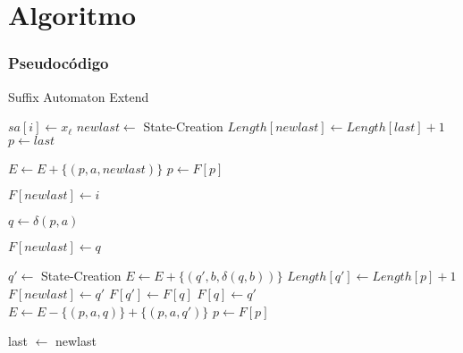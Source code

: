 \section{Algoritmo}\label{Algorithm}

\subsubsection{Pseudocódigo}


\begin{alg}
	Suffix Automaton Extend
	\begin{algorithmic}[1]
		
			\State $sa[i] \leftarrow x_\ell$
			\State $newlast \leftarrow$ State-Creation
			\State $Length[newlast] \leftarrow Length[last]+1$
			\State $p \leftarrow last$
		
				\State  $E \leftarrow E + \{(p, a, newlast)\}$
				\State  $p \leftarrow F[p]$
			\EndWhile
			
				\State $F[newlast] \leftarrow i$
			
			\Else
				\State $q \leftarrow \delta(p, a)$
				
					\State $F[newlast] \leftarrow q$
				
				\Else
					\State $q' \leftarrow$ State-Creation
						\State  $E \leftarrow E + \{(q', b, \delta(q, b))\}$
					\EndFor
					\State $Length[q'] \leftarrow Length[p]+1$
					\State $F[newlast] \leftarrow q'$
					\State $F[q'] \leftarrow F[q]$
					\State $F[q] \leftarrow q'$
						\State  $E \leftarrow E - \{(p, a, q)\} + \{(p, a, q')\}$
						\State  $p \leftarrow F[p]$
					\EndWhile
				\EndIf

			\EndIf
			
			\State last $\leftarrow$ newlast
				
		\EndFunction
				
	\end{algorithmic}
\end{alg}

\cite{book:Crochemore1997}